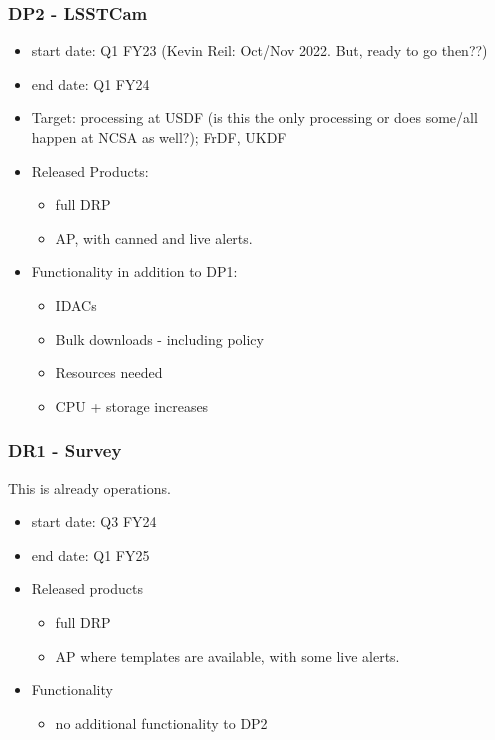 \subsubsection{DP2 - LSSTCam}
\begin{itemize}
\item start date: Q1 \gls{FY23} (Kevin Reil: Oct/Nov 2022. But, ready to go then??)
\item end date: Q1 \gls{FY24}
\item Target: processing at \gls{USDF} (is this the only processing or does some/all happen at \gls{NCSA} as well?); FrDF, UKDF
\item Released Products:
\begin{itemize}
\item full \gls{DRP}
\item \gls{AP}, with canned and live alerts.
\end{itemize}
\item Functionality in addition to \gls{DP1}:
\begin{itemize}
\item IDACs
\item Bulk downloads - including policy
\item Resources needed
\item \gls{CPU} + storage increases
\end{itemize}
\end{itemize}
\subsubsection{DR1 - Survey}
This is already operations.

\begin{itemize}
\item start date: Q3 \gls{FY24}
\item end date: Q1 \gls{FY25}
\item Released products
\begin{itemize}
\item full \gls{DRP}
\item \gls{AP} where templates are available, with some live alerts.
\end{itemize}
\item Functionality
\begin{itemize}
\item no additional functionality to \gls{DP2}
\end{itemize}
\end{itemize}
